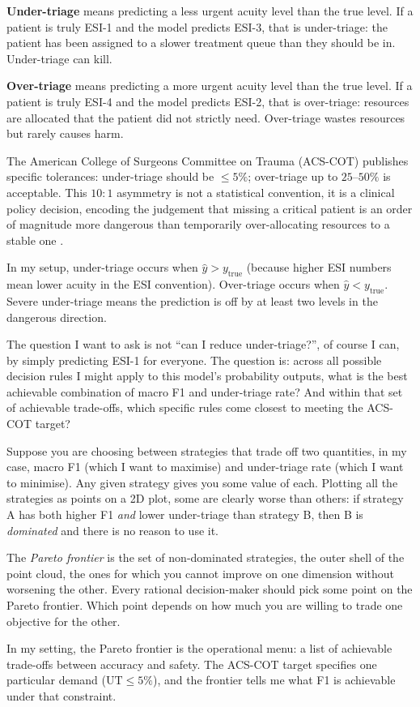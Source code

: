 \begin{notebox}
\textbf{Under-triage} means predicting a less urgent acuity level than the true level. If a patient is truly ESI-1 and the model predicts ESI-3, that is under-triage: the patient has been assigned to a slower treatment queue than they should be in. Under-triage can kill.

\textbf{Over-triage} means predicting a more urgent acuity level than the true level. If a patient is truly ESI-4 and the model predicts ESI-2, that is over-triage: resources are allocated that the patient did not strictly need. Over-triage wastes resources but rarely causes harm.

The American College of Surgeons Committee on Trauma (ACS-COT) publishes specific tolerances: under-triage should be $\leq 5\%$; over-triage up to $25$--$50\%$ is acceptable. This $10{:}1$ asymmetry is not a statistical convention, it is a clinical policy decision, encoding the judgement that missing a critical patient is an order of magnitude more dangerous than temporarily over-allocating resources to a stable one \citep{acscot2014resources}.

In my setup, under-triage occurs when $\hat{y} > y_{\text{true}}$ (because higher ESI numbers mean lower acuity in the ESI convention). Over-triage occurs when $\hat{y} < y_{\text{true}}$. Severe under-triage means the prediction is off by at least two levels in the dangerous direction.
\end{notebox}

The question I want to ask is not ``can I reduce under-triage?'', of course I can, by simply predicting ESI-1 for everyone. The question is: across all possible decision rules I might apply to this model's probability outputs, what is the best achievable combination of macro F1 and under-triage rate? And within that set of achievable trade-offs, which specific rules come closest to meeting the ACS-COT target?

\begin{notebox}
Suppose you are choosing between strategies that trade off two quantities, in my case, macro F1 (which I want to maximise) and under-triage rate (which I want to minimise). Any given strategy gives you some value of each. Plotting all the strategies as points on a 2D plot, some are clearly worse than others: if strategy A has both higher F1 \emph{and} lower under-triage than strategy B, then B is \emph{dominated} and there is no reason to use it.

The \emph{Pareto frontier} is the set of non-dominated strategies, the outer shell of the point cloud, the ones for which you cannot improve on one dimension without worsening the other. Every rational decision-maker should pick some point on the Pareto frontier. Which point depends on how much you are willing to trade one objective for the other.

In my setting, the Pareto frontier is the operational menu: a list of achievable trade-offs between accuracy and safety. The ACS-COT target specifies one particular demand ($\text{UT} \leq 5\%$), and the frontier tells me what F1 is achievable under that constraint.
\end{notebox}

